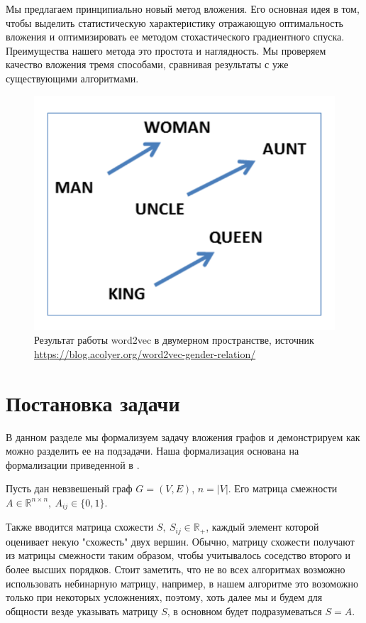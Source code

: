 \documentclass[12pt,a4paper]{extarticle}
\newcommand{\R}{\mathbb{R}}
\begin{document}
    Мы предлагаем принципиально новый метод вложения.
    Его основная идея в том, чтобы выделить статистическую характеристику отражающую оптимальность вложения и оптимизировать ее методом стохастического градиентного спуска.
    Преимущества нашего метода это простота и наглядность.
    Мы проверяем качество вложения тремя способами, сравнивая результаты с уже существующими алгоритмами.

    \begin{figure}
    \centering
    \includegraphics[width=.6\linewidth]{src/images/word2vec.png}
    \caption{Результат работы word2vec в двумерном пространстве, источник \url{https://blog.acolyer.org/word2vec-gender-relation/}}
    \label{fig:word2vec}
    \end{figure}

    \section{Постановка задачи}
    В данном разделе мы формализуем задачу вложения графов и демонстрируем как можно разделить ее на подзадачи. Наша формализация основана на формализации приведенной в \cite{survey2}.

    Пусть дан невзвешеный граф $G = (V, E)$, $n = |V|$. Его матрица смежности $A \in \R^{n \times n},\ A_{ij} \in \{0, 1\}$.
    
    Также вводится матрица схожести $S,\ S_{ij} \in \R_{+}$,  каждый элемент которой оценивает некую "схожесть" двух вершин. Обычно, матрицу схожести получают из матрицы смежности таким образом, чтобы учитывалось соседство второго и более высших порядков. Стоит заметить, что не во всех алгоритмах возможно использовать небинарную матрицу, например, в нашем алгоритме это возоможно только при некоторых усложнениях, поэтому, хоть далее мы и будем для общности везде указывать матрицу $S$, в основном будет подразумеваться $S = A$.
    
\end{document}
